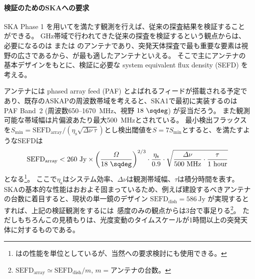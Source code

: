 {\paragraph{検証のためのSKAへの要求}
SKA Phase 1 を用いてを満たす観測を行えば、従来の探査結果を検証することができる。
GHz帯域で行われてきた従来の探査を検証するという観点からは、必要になるのは\skamid{} または \skasur{} のアンテナであり、突発天体探査で最も重要な要素は視野の広さであるから、\skasur{}が最も適したアンテナといえる。
そこで主にアンテナの基本デザインをもとに、検証に必要な system equivalent flux density (SEFD) を考える。

 アンテナには phased array feed (PAF) とよばれるフィードが搭載される予定であり、既存のASKAPの周波数帯域を考えると、SKA1で最初に実装するのは PAF Band~2 (周波数650--1670~MHz、視野 $18~\sqdeg$) が妥当だろう。
また観測可能な帯域幅は片偏波あたり最大500~MHzとされている。
最小検出フラックスを$S_\text{min}=\text{SEFD}_\text{array}/(\eta_\text{s}\sqrt{\varDelta \nu \ \tau})$とし検出閾値を$S=7S_\text{min}$とすると、を満たすようなSEFDは
\begin{align}
	\text{SEFD}_\text{array} 
	< 260~\text{Jy} \times \left( \frac{\varOmega}{18~\sqdeg} \right)^{2/3}
		\cdot \frac{\eta_\text{s}}{0.9} \cdot 
		\sqrt{\frac{\varDelta \nu}{500~\text{MHz}} \cdot \frac{\tau}{1~\text{hour}}}
		\label{eq:transients.s3.unknowns.sefd}
\end{align}
となる\footnote{はの性能を単位としているが、当然への要求検討にも使用できる。}。
ここで$\eta_\text{s}$はシステム効率、$\varDelta \nu$は観測帯域幅、$\tau$は積分時間を表す。
SKAの基本的な性能はおおよそ固まっているため、例えば建設するべきアンテナの台数に着目すると、現状の単一鏡のデザイン $\text{SEFD}_\text{dish}=586~\text{Jy}$ が実現するとすれば、上記の検証観測をするには{\ 感度のみの観点からは}3台で事足りる\footnote{$\text{SEFD}_\text{array} \simeq \text{SEFD}_\text{dish}/m$, $m=\text{アンテナの台数}$。}。
ただしもちろんこの見積もりは、光度変動のタイムスケールが1時間以上の突発天体に対するものである。

}
